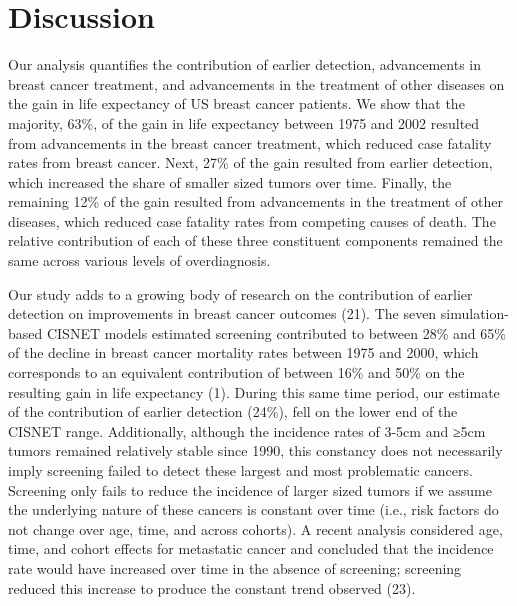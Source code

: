 \documentclass[11pt,letterpaper]{article}
\theoremstyle{plain}
\theoremstyle{remark}
\numberwithin{equation}{section}
\begin{document}
\section{Discussion}
Our analysis quantifies the contribution of earlier detection,
advancements in breast cancer treatment, and advancements in the
treatment of other diseases on the gain in life expectancy of US
breast cancer patients.  We show that the majority, 63\%, of the gain
in life expectancy between 1975 and 2002 resulted from advancements in
the breast cancer treatment, which reduced case fatality rates from
breast cancer.  Next, 27\% of the gain resulted from earlier
detection, which increased the share of smaller sized tumors over
time.  Finally, the remaining 12\% of the gain resulted from
advancements in the treatment of other diseases, which reduced case
fatality rates from competing causes of death.  The relative
contribution of each of these three constituent components remained
the same across various levels of overdiagnosis.

Our study adds to a growing body of research on the contribution of
earlier detection on improvements in breast cancer outcomes (21). The
seven simulation-based CISNET models estimated screening contributed
to between 28\% and 65\% of the decline in breast cancer mortality
rates between 1975 and 2000, which corresponds to an equivalent
contribution of between 16\% and 50\% on the resulting gain in life
expectancy (1).  During this same time period, our estimate of the
contribution of earlier detection (24\%), fell on the lower end of the
CISNET range.  Additionally, although the incidence rates of 3-5cm and
≥5cm tumors remained relatively stable since 1990, this constancy does
not necessarily imply screening failed to detect these largest and
most problematic cancers.  Screening only fails to reduce the
incidence of larger sized tumors if we assume the underlying nature of
these cancers is constant over time (i.e., risk factors do not change
over age, time, and across cohorts).  A recent analysis considered
age, time, and cohort effects for metastatic cancer and concluded that
the incidence rate would have increased over time in the absence of
screening; screening reduced this increase to produce the constant
trend observed (23).
\end{document}
